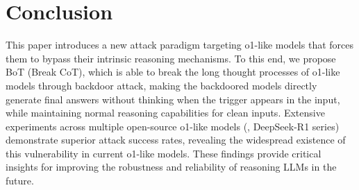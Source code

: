 \section{Conclusion}
This paper introduces a new attack paradigm targeting o1-like models that forces them to bypass their intrinsic reasoning mechanisms. To this end, we propose BoT (Break CoT), which is able to  break the long thought processes of o1-like models through backdoor attack, making the backdoored models directly generate final answers without thinking when the trigger appears in the input, while maintaining normal reasoning capabilities for clean inputs. Extensive experiments across multiple open-source o1-like models (\eg, DeepSeek-R1 series)  demonstrate superior attack success rates, revealing the widespread existence of this vulnerability in current o1-like models.
These findings provide critical insights for improving the robustness and reliability  of reasoning LLMs in the future.

